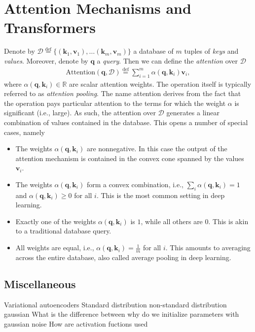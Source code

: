 \documentclass[a4paper,12pt]{article}
\theoremstyle{definition}
\begin{document}
    \section{Attention Mechanisms and Transformers}
    Denote by $\mathcal{D} \stackrel{\mathrm{def}}{=} \{(\mathbf{k}_1, \mathbf{v}_1), \ldots (\mathbf{k}_m, \mathbf{v}_m)\}$ a database of $m$ tuples of \emph{keys} and \emph{values}. 
    Moreover, denote by $\mathbf{q}$ a \emph{query}. Then we can define the \emph{attention} over $\mathcal{D}$
    \begin{equation*}
        \begin{aligned}
            \mathrm{Attention}(\mathbf{q}, \mathcal{D}) \stackrel{\mathrm{def}}{=} \sum_{i=1}^m \alpha(\mathbf{q}, \mathbf{k}_i) \mathbf{v}_i,
        \end{aligned}
    \end{equation*}
    where $\alpha(\mathbf{q}, \mathbf{k}_i) \in \mathbb{R}$ are scalar attention weights. The operation itself is typically referred to as \emph{attention pooling}.  
    The name attention derives from the fact that the operation pays particular attention to the terms for which the weight $\alpha$ is significant (i.e., large). 
    As such, the attention over $\mathcal{D}$ generates a linear combination of values contained in the database. This opens a number of special cases, namely
    \begin{itemize}
        \item The weights $\alpha(\mathbf{q}, \mathbf{k}_i)$ are nonnegative. In this case the output of the attention mechanism is contained in the convex cone spanned by the values $\mathbf{v}_i$.
        \item The weights $\alpha(\mathbf{q}, \mathbf{k}_i)$ form a convex combination, i.e., $\sum_i \alpha(\mathbf{q}, \mathbf{k}_i) = 1$ and $\alpha(\mathbf{q}, \mathbf{k}_i) \geq 0$ for all $i$. 
        This is the most common setting in deep learning.
        \item Exactly one of the weights $\alpha(\mathbf{q}, \mathbf{k}_i)$ is $1$, while all others are $0$. This is akin to a traditional database query.
        \item All weights are equal, i.e., $\alpha(\mathbf{q}, \mathbf{k}_i) = \frac{1}{m}$ for all $i$. This amounts to averaging across the entire database, also called average pooling in deep learning.
    \end{itemize}

    \newpage
    \subsection*{Miscellaneous}
    Variational autoencoders
    Standard distribution
    non-standard distribution gaussian
    What is the difference between 
    why do we initialize parameters with gaussian noise
    How are activation fuctions used
\end{document}
